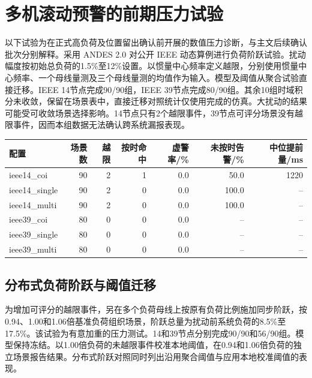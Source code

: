 \documentclass[UTF8,a4paper,11pt]{ctexart}
\begin{document}
\section{多机滚动预警的前期压力试验}
以下试验为在正式高负荷及位置留出确认前开展的数值压力诊断，与主文后续确认批次分别解释。采用 ANDES 2.0 对公开 IEEE 动态算例进行负荷阶跃试验。扰动幅度按初始总负荷的1.5\%至12\%设置。以惯量中心频率定义越限，分别使用惯量中心频率、一个母线量测及三个母线量测的均值作为输入。模型及阈值从聚合试验直接迁移。IEEE 14节点完成90/90组，IEEE 39节点完成80/90组。其余10组时域积分未收敛，保留在场景表中，直接迁移对照统计仅使用完成的仿真。大扰动的结果可能受可收敛场景选择影响。14节点只有2个越限事件，39节点可评分场景没有越限事件，因而本组数据无法确认跨系统漏报表现。
\begin{center}
\small\setlength{\tabcolsep}{5pt}
\begin{tabular}{lrrrrrr}
\toprule
配置 & 场景数 & 越限 & 按时命中 & 虚警率/\% & 未按时告警/\% & 中位提前量/ms\\
\midrule
ieee14\_coi & 90 & 2 & 1 & 0.0 & 50.0 & 1220 \\
ieee14\_single & 90 & 2 & 0 & 0.0 & 100.0 & -- \\
ieee14\_multi & 90 & 2 & 0 & 0.0 & 100.0 & -- \\
ieee39\_coi & 80 & 0 & 0 & 0.0 & -- & -- \\
ieee39\_single & 80 & 0 & 0 & 0.0 & -- & -- \\
ieee39\_multi & 80 & 0 & 0 & 0.0 & -- & -- \\
\bottomrule
\end{tabular}
\end{center}

\subsection{分布式负荷阶跃与阈值迁移}
为增加可评分的越限事件，另在多个负荷母线上按原有负荷比例施加同步阶跃，按0.94、1.00和1.06倍基准负荷组织场景，阶跃总量为扰动前系统负荷的8.5\%至17.5\%。该试验为有意加重的压力测试。14和39节点分别完成90/90和56/90组。模型保持冻结。以1.00倍负荷的未越限事件校准本地阈值，在0.94和1.06倍负荷的独立场景报告结果。分布式阶跃对照同时列出沿用聚合阈值与应用本地校准阈值的表现。
\end{document}
